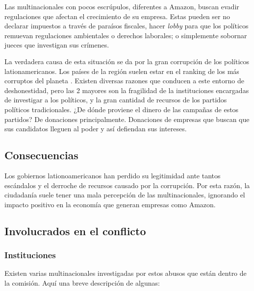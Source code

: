 \documentclass[11pt,a4paper]{article}
\begin{document}
\noindent Las multinacionales con pocos escrúpulos, diferentes a Amazon, buscan evadir regulaciones que afectan el crecimiento de su empresa. Estas pueden ser no declarar impuestos a través de paraísos fiscales, hacer \textit{lobby} para que los políticos remuevan regulaciones ambientales o derechos laborales; o simplemente sobornar jueces que investigan sus crímenes.

La verdadera causa de esta situación se da por la gran corrupción de los políticos lationamericanos. Los países de la región suelen estar en el ranking de los más corruptos del planeta \cite{cor}. Existen diversas razones que conducen a este entorno de deshonestidad, pero las 2 mayores son la fragilidad de la instituciones encargadas de investigar a los políticos, y la gran cantidad de recursos de los partidos políticos tradicionales. ¿De dónde proviene el dinero de las campañas de estos partidos? De donaciones principalmente. Donaciones de empresas que buscan que sus candidatos lleguen al poder y así defiendan sus intereses.

\subsection{Consecuencias}

\noindent Los gobiernos lationoamericanos han perdido su legitimidad ante tantos escándalos y el derroche de recursos causado por la corrupción. Por esta razón, la ciudadanía suele tener una mala percepción de las multinacionales, ignorando el impacto positivo en la economía que generan empresas como Amazon. 
\subsection{Involucrados en el conflicto}

\subsubsection{Instituciones}

\noindent Existen varias multinacionales investigadas por estos abusos que están dentro de la comisión. Aquí una breve descripción de algunas:
\end{document}

